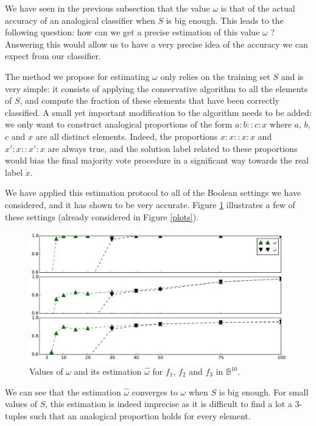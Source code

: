 {We have seen in the previous subsection that the value $\omega$ is that of the actual
accuracy of an analogical classifier when $S$ is big enough. This leads to the
following question: how can we get a precise estimation of this value $\omega$
? Answering this would allow us to have a very precise idea of the accuracy we
can expect from our classifier.

The method we propose for estimating $\omega$ only relies on the training set $S$
and is very simple: it consists of applying the conservative algorithm to all
the elements of $S$, and compute the fraction of these elements that have been
correctly classified. A small yet important modification to the algorithm needs
to be added: we only want to construct analogical proportions of the form $a :
b :: c : x$ where $a$, $b$, $c$ and $x$ are all distinct elements. Indeed, the
proportions $x : x :: x : x$ and $x' : x :: x' : x$ are always true, and the
solution label related to these proportions would bias the final majority vote
procedure in a significant way towards the real label $\dot{x}$.

We have applied this estimation protocol to all of the Boolean settings we have
considered, and it has shown to be very accurate. Figure \ref{omegaplots}
illustrates a few of these settings (already considered in Figure \ref{plots}).
\begin{figure}
  \caption{Values of $\omega$ and its estimation $\hat{\omega}$ for $f_1$, $f_2$ and $f_3$ in
  $\mathbb{B}^{10}$.}
\label{omegaplots}
\includegraphics[width=\linewidth]{figures/ecai_estimation_omega.pdf}
\end{figure}
We can see that the estimation $\hat{\omega}$ converges to $\omega$ when $S$ is
big enough. For small values of $S$, this estimation is indeed imprecise as it
is difficult to find a lot a 3-tuples such that an analogical proportion holds
for every element.

}

